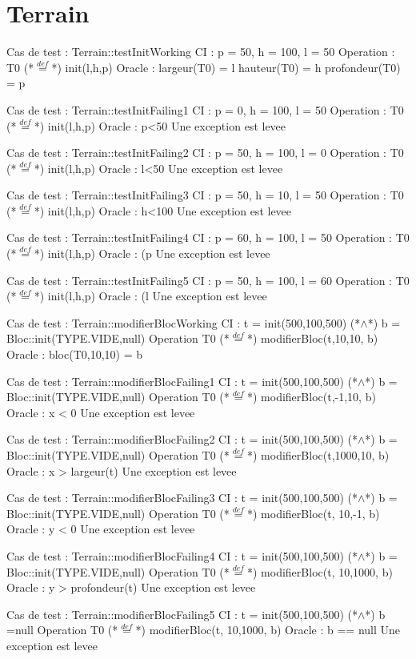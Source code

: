 \documentclass[a4paper, 11pt, notitlepage]{report}
\begin{document}
\section{Terrain}
\begin{Test}
Cas de test  : Terrain::testInitWorking
CI : p = 50, h = 100, l = 50
Operation : T0 (*$\stackrel{def}{=}$*) init(l,h,p)
Oracle :
	largeur(T0) = l
	hauteur(T0) = h
	profondeur(T0) = p

Cas de test  : Terrain::testInitFailing1
CI :  p = 0, h = 100, l = 50
Operation : T0 (*$\stackrel{def}{=}$*) init(l,h,p)
Oracle :
	p<50
	Une exception est levee

Cas de test  : Terrain::testInitFailing2
CI :  p = 50, h = 100, l = 0
Operation : T0 (*$\stackrel{def}{=}$*) init(l,h,p)
Oracle :
	l<50
	Une exception est levee

Cas de test  : Terrain::testInitFailing3
CI :  p = 50, h = 10, l = 50
Operation : T0 (*$\stackrel{def}{=}$*) init(l,h,p)
Oracle :
	h<100
	Une exception est levee

Cas de test  : Terrain::testInitFailing4
CI :  p = 60, h = 100, l = 50
Operation : T0 (*$\stackrel{def}{=}$*) init(l,h,p)
Oracle :
	(p%
	Une exception est levee

Cas de test  : Terrain::testInitFailing5
CI :  p = 50, h = 100, l = 60
Operation : T0 (*$\stackrel{def}{=}$*) init(l,h,p)
Oracle :
	(l%
	Une exception est levee

Cas de test : Terrain::modifierBlocWorking
CI : t = init(500,100,500) (*$\land$*) b = Bloc::init(TYPE.VIDE,null)
Operation T0 (*$\stackrel{def}{=}$*) modifierBloc(t,10,10, b)
Oracle :
	bloc(T0,10,10) = b

Cas de test : Terrain::modifierBlocFailing1
CI : t = init(500,100,500) (*$\land$*) b = Bloc::init(TYPE.VIDE,null)
Operation T0 (*$\stackrel{def}{=}$*) modifierBloc(t,-1,10, b)
Oracle :
	x < 0
	Une exception est levee

Cas de test : Terrain::modifierBlocFailing2
CI : t = init(500,100,500) (*$\land$*) b = Bloc::init(TYPE.VIDE,null)
Operation T0 (*$\stackrel{def}{=}$*) modifierBloc(t,1000,10, b)
Oracle :
	x > largeur(t)
	Une exception est levee

Cas de test : Terrain::modifierBlocFailing3
CI : t = init(500,100,500) (*$\land$*) b = Bloc::init(TYPE.VIDE,null)
Operation T0 (*$\stackrel{def}{=}$*) modifierBloc(t, 10,-1, b)
Oracle :
	y < 0
	Une exception est levee 
 
Cas de test : Terrain::modifierBlocFailing4
CI : t = init(500,100,500) (*$\land$*) b = Bloc::init(TYPE.VIDE,null)
Operation T0 (*$\stackrel{def}{=}$*) modifierBloc(t, 10,1000, b)
Oracle :
	y > profondeur(t)
	Une exception est levee 

Cas de test : Terrain::modifierBlocFailing5
CI : t = init(500,100,500) (*$\land$*) b =null
Operation T0 (*$\stackrel{def}{=}$*) modifierBloc(t, 10,1000, b)
Oracle :
	b == null
	Une exception est levee 

	    
\end{Test}
\end{document}
